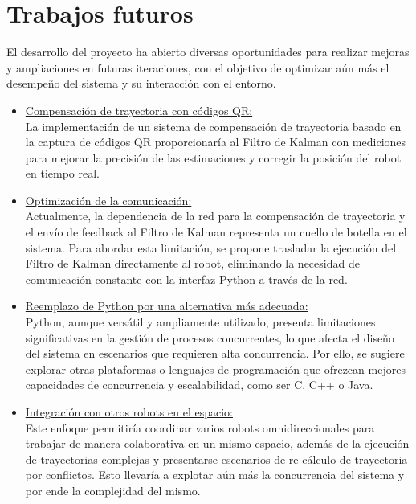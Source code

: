 \newpage
\chapter{Trabajos futuros}

El desarrollo del proyecto ha abierto diversas oportunidades para realizar mejoras y ampliaciones en futuras iteraciones, con el objetivo de optimizar aún más el desempeño del sistema y su interacción con el entorno.

\begin{itemize}
    \item \underline{Compensación de trayectoria con códigos QR:} \\
    La implementación de un sistema de compensación de trayectoria basado en la captura de códigos QR proporcionaría al Filtro de Kalman con mediciones para mejorar la precisión de las estimaciones y corregir la posición del robot en tiempo real. \\

    \item \underline{Optimización de la comunicación:} \\
    Actualmente, la dependencia de la red para la compensación de trayectoria y el envío de feedback al Filtro de Kalman representa un cuello de botella en el sistema. Para abordar esta limitación, se propone trasladar la ejecución del Filtro de Kalman directamente al robot, eliminando la necesidad de comunicación constante con la interfaz Python a través de la red. \\

    \item \underline{Reemplazo de Python por una alternativa más adecuada:} \\
    Python, aunque versátil y ampliamente utilizado, presenta limitaciones significativas en la gestión de procesos concurrentes, lo que afecta el diseño del sistema en escenarios que requieren alta concurrencia. Por ello, se sugiere explorar otras plataformas o lenguajes de programación que ofrezcan mejores capacidades de concurrencia y escalabilidad, como ser C, C++ o Java. \\

    \item \underline{Integración con otros robots en el espacio:} \\
    Este enfoque permitiría coordinar varios robots omnidireccionales para trabajar de manera colaborativa en un mismo espacio, además de la ejecución de trayectorias complejas y presentarse escenarios de re-cálculo de trayectoria por conflictos. Esto llevaría a explotar aún más la concurrencia del sistema y por ende la complejidad del mismo.
\end{itemize}
